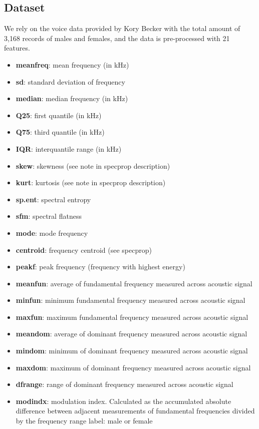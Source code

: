 \documentclass[natbib]{muthesis}
\begin{document}
 \subsection{Dataset}
 We rely on the voice data provided by Kory Becker with the total amount of 3,168 records of males and females, and the data is pre-processed with 21 features.\cite{Dataset}
 \begin{itemize}
 	  \setlength\itemsep{0em}
 \item \textbf{meanfreq}: mean frequency (in kHz)
 \item \textbf{sd}: standard deviation of frequency
 \item \textbf{median}: median frequency (in kHz)
 \item \textbf{Q25}: first quantile (in kHz)
 \item \textbf{Q75}: third quantile (in kHz)
 \item \textbf{IQR}: interquantile range (in kHz)
 \item \textbf{skew}: skewness (see note in specprop description)
 \item \textbf{kurt}: kurtosis (see note in specprop description)
 \item \textbf{sp.ent}: spectral entropy
 \item \textbf{sfm}: spectral flatness
 \item \textbf{mode}: mode frequency
 \item \textbf{centroid}: frequency centroid (see specprop)
 \item \textbf{peakf}: peak frequency (frequency with highest energy)
 \item \textbf{meanfun}: average of fundamental frequency measured across acoustic signal
 \item \textbf{minfun}: minimum fundamental frequency measured across acoustic signal
 \item \textbf{maxfun}: maximum fundamental frequency measured across acoustic signal
 \item \textbf{meandom}: average of dominant frequency measured across acoustic signal
 \item \textbf{mindom}: minimum of dominant frequency measured across acoustic signal
 \item \textbf{maxdom}: maximum of dominant frequency measured across acoustic signal
 \item \textbf{dfrange}: range of dominant frequency measured across acoustic signal
 \item \textbf{modindx}: modulation index. Calculated as the accumulated absolute difference between adjacent measurements of fundamental frequencies divided by the frequency range
 label: male or female
 \end{itemize}
\end{document}
